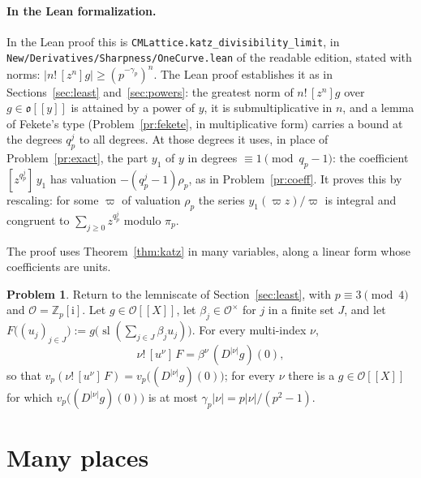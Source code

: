 \documentclass[reqno]{amsart}
\theoremstyle{definition}
\newtheorem{problem}{Problem}[section]
\theoremstyle{plain}
\newcommand{\Z}{\mathbb{Z}}
\newcommand{\ii}{\mathrm{i}}
\newcommand{\Oc}{\mathcal{O}}
\newcommand{\sll}{\operatorname{sl}}
\begin{document}
\paragraph{In the Lean formalization.}
In the Lean proof \cite{GL} this is \texttt{CMLattice.katz\_divisibility\_limit}, in \texttt{New/Derivatives/Sharpness/OneCurve.lean} of the readable edition, stated with norms: \(\lvert n!\,[z^n]g\rvert \ge (p^{-\gamma_p})^n\).  The Lean proof establishes it as in Sections~\ref{sec:least} and~\ref{sec:powers}: the greatest norm of \(n!\,[z^n]g\) over \(g \in \mathfrak o[[y]]\) is attained by a power of \(y\), it is submultiplicative in \(n\), and a lemma of Fekete's type (Problem~\ref{pr:fekete}, in multiplicative form) carries a bound at the degrees \(q_p^j\) to all degrees.  At those degrees it uses, in place of Problem~\ref{pr:exact}, the part \(y_1\) of \(y\) in degrees \(\equiv 1 \pmod{q_p - 1}\): the coefficient \([z^{q_p^j}]\, y_1\) has valuation \(-(q_p^j - 1)\rho_p\), as in Problem~\ref{pr:coeff}.  It proves this by rescaling: for some \(\varpi\) of valuation \(\rho_p\) the series \(y_1(\varpi z)/\varpi\) is integral and congruent to \(\sum_{j \ge 0} z^{q_p^j}\) modulo \(\pi_p\).

The proof uses Theorem~\ref{thm:katz} in many variables, along a linear form whose coefficients are units.

\begin{problem}\label{pr:many-variables}
Return to the lemniscate of Section~\ref{sec:least}, with \(p \equiv 3 \pmod 4\) and \(\Oc = \Z_p[\ii]\).  Let \(g \in \Oc[[X]]\), let \(\beta_j \in \Oc^\times\) for \(j\) in a finite set \(J\), and let \(F\bigl((u_j)_{j \in J}\bigr) := g\bigl(\sll(\sum_{j \in J} \beta_j u_j)\bigr)\).  For every multi-index \(\nu\),
\[
  \nu!\,[u^\nu]\, F = \beta^\nu\, (D^{\lvert\nu\rvert} g)(0),
\]
so that \(v_p(\nu!\,[u^\nu]\, F) = v_p\bigl((D^{\lvert\nu\rvert}g)(0)\bigr)\); for every \(\nu\) there is a \(g \in \Oc[[X]]\) for which \(v_p\bigl((D^{\lvert\nu\rvert}g)(0)\bigr)\) is at most \(\gamma_p\lvert\nu\rvert = p\lvert\nu\rvert/(p^2-1)\).
\end{problem}

\section{Many places}\label{sec:places}
\end{document}
